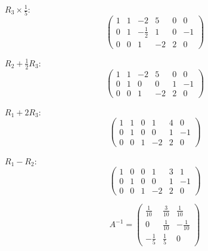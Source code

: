 $R_3 \times \frac{1}{5}$:
\[
	\left(\begin{array}{ccc|ccc}
			1 & 1 & -2           & 5  & 0 & 0  \\
			0 & 1 & -\frac{1}{2} & 1  & 0 & -1 \\
			0 & 0 & 1            & -2 & 2 & 0
		\end{array}\right)
\]

$R_2 + \frac{1}{2}R_3$:
\[
	\left(\begin{array}{ccc|ccc}
			1 & 1 & -2 & 5  & 0 & 0  \\
			0 & 1 & 0 & 0  & 1 & -1 \\
			0 & 0 & 1 & -2 & 2 & 0
		\end{array}\right)
\]

$R_1 + 2R_3$:
\[
	\left(\begin{array}{ccc|ccc}
			1 & 1 & 0 & 1  & 4 & 0  \\
			0 & 1 & 0 & 0  & 1 & -1 \\
			0 & 0 & 1 & -2 & 2 & 0
		\end{array}\right)
\]

$R_1 - R_2$:
\[
	\left(\begin{array}{ccc|ccc}
			1 & 0 & 0 & 1  & 3 & 1  \\
			0 & 1 & 0 & 0  & 1 & -1 \\
			0 & 0 & 1 & -2 & 2 & 0
		\end{array}\right)
\]

\[
	A^{-1} = \begin{pmatrix}
		\frac{1}{10} & \frac{3}{10} & \frac{1}{10}  \\
		0            & \frac{1}{10} & -\frac{1}{10} \\
		-\frac{1}{5} & \frac{1}{5}  & 0
	\end{pmatrix}
\]